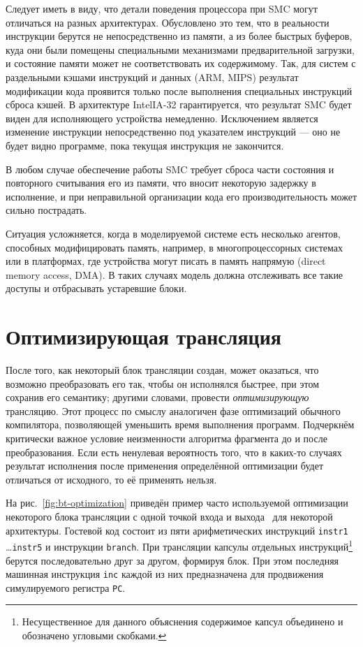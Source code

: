 Следует иметь в виду, что детали поведения процессора при SMC могут отличаться на разных архитектурах. Обусловлено это тем, что в реальности инструкции берутся не непосредственно из памяти, а из более быстрых буферов, куда они были помещены специальными механизмами предварительной загрузки, и состояние памяти может не соответствовать их содержимому. Так, для систем с раздельными кэшами инструкций и данных (ARM, MIPS) результат модификации кода проявится только после выполнения  специальных инструкций сброса кэшей. В архитектуре Intel\textregistered IA-32 гарантируется, что результат SMC будет виден для исполняющего устройства немедленно. Исключением является изменение инструкции непосредственно под указателем инструкций — оно не будет видно программе, пока текущая инструкция не закончится.

В любом случае обеспечение работы SMC требует сброса части состояния и повторного считывания его из памяти, что вносит некоторую задержку в исполнение, и при неправильной организации кода его производительность может сильно пострадать.  

Ситуация усложняется, когда в моделируемой системе есть несколько агентов, способных модифицировать память, например, в многопроцессорных системах или в платформах, где устройства могут писать в память напрямую (\abbr direct memory access, DMA). В таких случаях модель должна отслеживать все такие доступы и отбрасывать устаревшие блоки.

\section{Оптимизирующая трансляция}\label{sec:optimisations}

После того, как некоторый блок трансляции создан, может оказаться, что возможно преобразовать его так, чтобы он исполнялся быстрее, при этом сохранив его семантику; другими словами, провести \emph{оптимизирующую} трансляцию. Этот процесс по смыслу аналогичен фазе оптимизаций обычного компилятора, позволяющей уменьшить время выполнения программ. Подчеркнём критически важное условие неизменности алгоритма фрагмента до и после преобразования. Если есть ненулевая вероятность того, что в каких-то случаях результат исполнения после применения определённой оптимизации будет отличаться от исходного, то её применять нельзя.

На рис.~\ref{fig:bt-optimization} приведён пример часто используемой оптимизации некоторого блока трансляции с одной точкой входа и выхода~\cite{helmstetter2011} для некоторой архитектуры. Гостевой код состоит из пяти арифметических инструкций \texttt{instr1} \dots \texttt{instr5} и инструкции \texttt{branch}. При трансляции капсулы отдельных инструкций\footnote{Несущественное для данного объяснения содержимое капсул объединено и обозначено угловыми скобками.} берутся последовательно друг за другом, формируя блок. При этом последняя машинная инструкция \texttt{inc} каждой из них предназначена для продвижения симулируемого регистра \texttt{PC}. 

